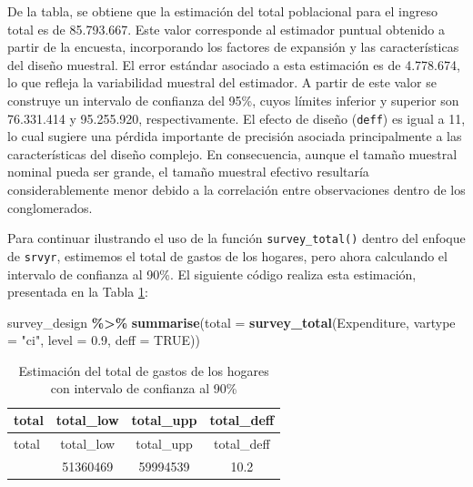 \documentclass[
  spanish,
  12pt,
]{book}
\newenvironment{Shaded}{\begin{snugshade}}{\end{snugshade}}
\newcommand{\AttributeTok}[1]{\textcolor[rgb]{0.13,0.29,0.53}{#1}}
\newcommand{\ConstantTok}[1]{\textcolor[rgb]{0.56,0.35,0.01}{#1}}
\newcommand{\FloatTok}[1]{\textcolor[rgb]{0.00,0.00,0.81}{#1}}
\newcommand{\FunctionTok}[1]{\textcolor[rgb]{0.13,0.29,0.53}{\textbf{#1}}}
\newcommand{\NormalTok}[1]{#1}
\newcommand{\SpecialCharTok}[1]{\textcolor[rgb]{0.81,0.36,0.00}{\textbf{#1}}}
\newcommand{\StringTok}[1]{\textcolor[rgb]{0.31,0.60,0.02}{#1}}
\begin{document}
De la tabla, se obtiene que la estimación del total poblacional para el ingreso total es de 85.793.667. Este valor corresponde al estimador puntual obtenido a partir de la encuesta, incorporando los factores de expansión y las características del diseño muestral. El error estándar asociado a esta estimación es de 4.778.674, lo que refleja la variabilidad muestral del estimador. A partir de este valor se construye un intervalo de confianza del 95\%, cuyos límites inferior y superior son 76.331.414 y 95.255.920, respectivamente. El efecto de diseño (\texttt{deff}) es igual a 11, lo cual sugiere una pérdida importante de precisión asociada principalmente a las características del diseño complejo. En consecuencia, aunque el tamaño muestral nominal pueda ser grande, el tamaño muestral efectivo resultaría considerablemente menor debido a la correlación entre observaciones dentro de los conglomerados.

Para continuar ilustrando el uso de la función \texttt{survey\_total()} dentro del enfoque de \texttt{srvyr}, estimemos el total de gastos de los hogares, pero ahora calculando el intervalo de confianza al 90\%. El siguiente código realiza esta estimación, presentada en la Tabla \ref{tab:tab-total-gasto}:

\begin{Shaded}
\begin{Highlighting}[]
\NormalTok{survey\_design }\SpecialCharTok{\%\textgreater{}\%}
  \FunctionTok{summarise}\NormalTok{(}\AttributeTok{total =} \FunctionTok{survey\_total}\NormalTok{(Expenditure,}
                              \AttributeTok{vartype =} \StringTok{"ci"}\NormalTok{, }\AttributeTok{level =} \FloatTok{0.9}\NormalTok{,}
                              \AttributeTok{deff =} \ConstantTok{TRUE}\NormalTok{))}
\end{Highlighting}
\end{Shaded}

\begin{longtable}[]{@{}lccc@{}}
\caption{\label{tab:tab-total-gasto}Estimación del total de gastos de los hogares con intervalo de confianza al 90\%}\tabularnewline
\toprule\noalign{}
total & total\_low & total\_upp & total\_deff \\
\midrule\noalign{}
\endfirsthead
\toprule\noalign{}
total & total\_low & total\_upp & total\_deff \\
\midrule\noalign{}
\endhead
\bottomrule\noalign{}
\endlastfoot
55677504 & 51360469 & 59994539 & 10.2 \\
\end{longtable}
\end{document}
